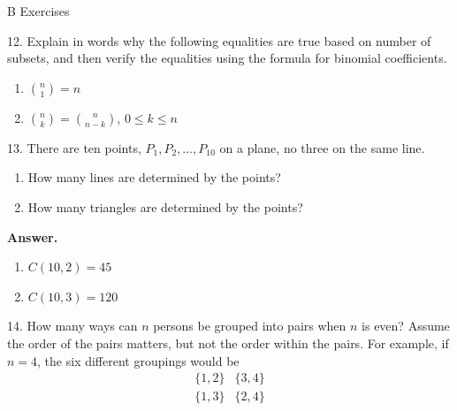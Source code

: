 \documentclass[10pt,]{book}
\theoremstyle{plain}
\theoremstyle{definition}
\theoremstyle{definition}
\theoremstyle{definition}
\begin{document}
\par\smallskip\noindent
\hypertarget{exercisegroup-9}{}\typeout{************************************************}
\typeout{************************************************}
B Exercises%
\begin{exercisegroup}
\item[12.]\hypertarget{exercise-54}{} Explain in words why the following equalities are true based on number of subsets,  and then verify the equalities using the formula for binomial coefficients.%
\par
\leavevmode%
\begin{enumerate}[label=\alph*]
\item\hypertarget{li-65}{}\(\binom{n}{1} = n\) %
\item\hypertarget{li-66}{}\(\binom{n}{k} = \binom{n}{n-k}\), \( 0 \leq k \leq n\)%
\end{enumerate}
%
\par\smallskip
\item[13.]\hypertarget{exercise-55}{}  There are ten points, \(P_1, P_2, \dots , P_{10}\) on a plane, no three on the same line.%
\par
\leavevmode%
\begin{enumerate}[label=\alph*]
\item\hypertarget{li-67}{}How many lines are determined by the points?%
\item\hypertarget{li-68}{} How many triangles are determined by the points?%
\end{enumerate}
%
\par\smallskip
\par\smallskip
\noindent\textbf{Answer.}\hypertarget{answer-28}{}\quad
\leavevmode%
\begin{enumerate}[label=\alph*]
\item\hypertarget{li-69}{} \(C(10,2)=45\)%
\item\hypertarget{li-70}{} \(C(10,3)=120\)%
\end{enumerate}
%
\item[14.]\hypertarget{exercise-56}{} How many ways can \(n\)  persons be grouped into pairs when \(n\)  is even? Assume the order of the pairs matters, but not the order within the pairs. For example, if \(n=4\), the six different groupings would be
\begin{equation*}\begin{array}{cc}
 \{1,2\} & \{3,4\} \\
 \{1,3\} & \{2,4\} \\

\end{array}
\end{equation*}
\end{exercisegroup}
\end{document}
